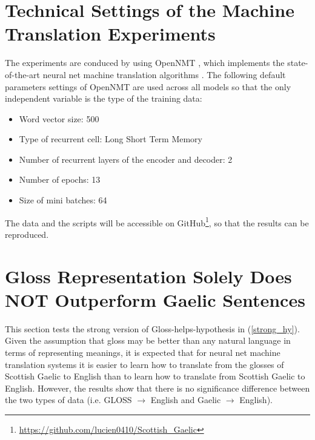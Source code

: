 \documentclass[a4paper]{article}
\begin{document}
\section{Technical Settings of the Machine Translation Experiments}\label{sec:experimet_setting}
The experiments are conduced by using OpenNMT \citep{2017opennmt}, which implements the state-of-the-art neural net machine translation algorithms \citep{cho2014properties, cho2014learning, bahdanau2014neural}. 
The following default parameters settings of OpenNMT are used across all models so that the only independent variable is the type of the training data: 
\begin{itemize}
\item Word vector size: 500
\item Type of recurrent cell: Long Short Term Memory
\item Number of recurrent layers of the encoder and decoder: 2
\item Number of epochs: 13 
\item Size of mini batches: 64 
\end{itemize}
The data and the scripts will be accessible on GitHub\footnote{\url{https://github.com/lucien0410/Scottish_Gaelic}}, so that the results can be reproduced.   

\section{Gloss Representation Solely Does NOT Outperform Gaelic Sentences} \label{gd_to_gl_to_en}
This section tests the strong version of Gloss-helps-hypothesis in (\ref{strong_hy}).
Given the assumption that gloss may be better than any natural language in terms of representing meanings, it is expected that for neural net machine translation systems it is easier to learn how to translate from the glosses of Scottish Gaelic to English than to learn how to translate from Scottish Gaelic to English. However, the results show that there is no significance difference between the two types of data (i.e. GLOSS $\rightarrow$ English and Gaelic $\rightarrow$ English). 
\end{document}
